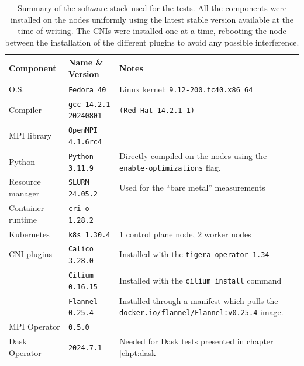 \begin{table}[H]
  \centering
  \begin{tabularx}{\linewidth}{p{}p{}X}  %
    \toprule
    \textbf{Component} & \textbf{Name \& Version} & \textbf{Notes} \\
    \midrule
    O.S.              & \texttt{Fedora 40}           & Linux kernel: \texttt{9.12-200.fc40.x86\_64} \\
    Compiler          & \texttt{gcc 14.2.1 20240801} & \texttt{(Red Hat 14.2.1-1)}   \\
    MPI library       & \texttt{OpenMPI 4.1.6rc4}    &  \\
    Python            & \texttt{Python 3.11.9}       & Directly compiled on the nodes using the \newline \texttt{-}\texttt{-enable-optimizations} flag. \\
    Resource manager  & \texttt{SLURM 24.05.2}       & Used for the ``bare metal'' measurements \\
    Container runtime & \texttt{cri-o 1.28.2}        &  \\
    Kubernetes        & \texttt{k8s 1.30.4}          &  1 control plane node, 2 worker nodes\\
    CNI-plugins       & \texttt{Calico 3.28.0}       & Installed with the \texttt{tigera-operator 1.34} \\
    \                 & \texttt{Cilium 0.16.15}      & Installed with the \texttt{cilium install} command \\
                      & \texttt{Flannel 0.25.4}      & Installed through a manifest which pulls the \texttt{docker.io/flannel/Flannel:v0.25.4} image. \\
    MPI Operator      & \texttt{0.5.0}               &  \\
    Dask Operator     & \texttt{2024.7.1}            & Needed for Dask tests presented in chapter \ref{chpt:dask} \\
   \bottomrule
  \end{tabularx}
  \caption{Summary of the software stack used for the tests. All the components
    were installed on the nodes uniformly using the latest stable version
    available at the time of writing. The CNIs were installed one at a time,
    rebooting the node between the installation of the different plugins to
    avoid any possible interference.}
  \label{tab:softwarestack}
\end{table}

